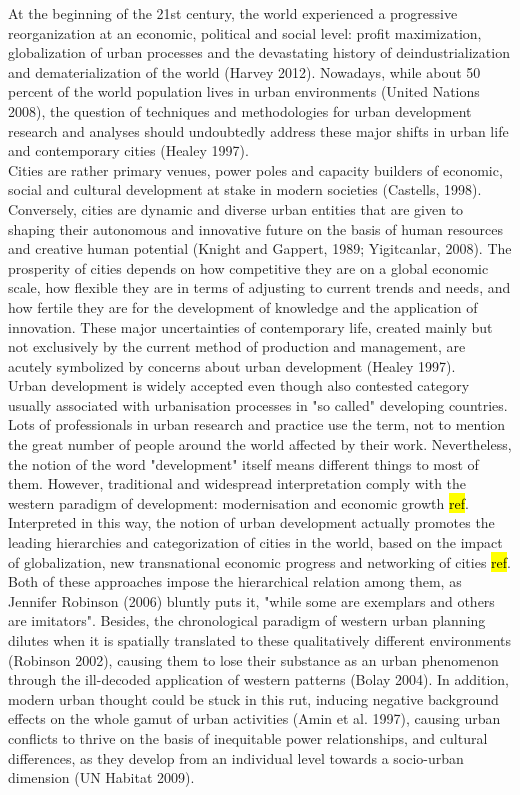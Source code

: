 \documentclass[11pt]{report}
\begin{document}
At the beginning of the 21st century, the world experienced a progressive reorganization at an economic, political and social level: profit maximization, globalization of urban processes and the devastating history of deindustrialization and dematerialization of the world (Harvey 2012). Nowadays, while about 50 percent of the world population lives in urban environments (United Nations 2008), the question of techniques and methodologies for urban development research and analyses should undoubtedly address these major shifts in urban life and contemporary cities (Healey 1997).
\\
Cities are rather primary venues, power poles and capacity builders of economic, social and cultural development at stake in modern societies (Castells, 1998). Conversely, cities are dynamic and diverse urban entities that are given to shaping their autonomous and innovative future on the basis of human resources and creative human potential (Knight and Gappert, 1989; Yigitcanlar, 2008). The prosperity of cities depends on how competitive they are on a global economic scale, how flexible they are in terms of adjusting to current trends and needs, and how fertile they are for the development of knowledge and the application of innovation. These major uncertainties of contemporary life, created mainly but not exclusively by the current method of production and management, are acutely symbolized by concerns about urban development (Healey 1997).
\\
Urban development is widely accepted even though also contested category usually associated with urbanisation processes in "so called" developing countries. Lots of professionals in urban research and practice use the term, not to mention the great number of people around the world affected by their work. Nevertheless, the notion of the word "development" itself means different things to most of them.
However, traditional and widespread interpretation comply with the western paradigm of development: modernisation and economic growth \hl{ref}. Interpreted in this way, the notion of urban development actually promotes the leading hierarchies and categorization of cities in the world, based on the impact of globalization, new transnational  economic  progress  and  networking  of  cities \hl{ref}. Both of these approaches impose the hierarchical relation among them, as Jennifer Robinson (2006) bluntly puts it, "while some are exemplars and others are imitators". Besides, the chronological paradigm of western urban planning dilutes when it is spatially translated to these qualitatively different environments (Robinson 2002), causing them to lose their substance as an urban phenomenon through the ill-decoded application of western patterns (Bolay 2004). In addition, modern urban thought could be stuck in this rut, inducing negative background effects on the whole gamut of urban activities (Amin et al. 1997), causing urban conflicts to thrive on the basis of inequitable power relationships, and cultural differences, as they develop from an individual level towards a socio-urban dimension (UN Habitat 2009).
\end{document}
